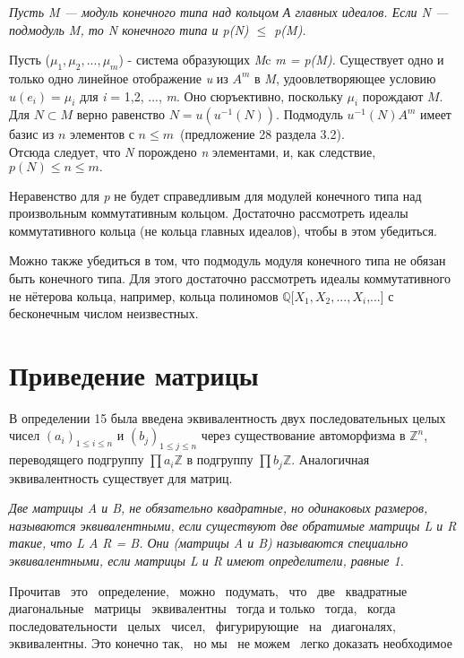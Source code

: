 

\begin{predl}
\hspace*{0.5cm}

\textit{Пусть M — модуль конечного типа над кольцом А главных идеалов. Если N — подмодуль M, то N конечного типа и p(N) $\leqslant $ p(M).}
\end{predl}
\begin{myproof}
Пусть ($\mu_1, \mu_2, ... ,\mu_m$) - система образующих \textit{M}c \textit{m = p(M).}
Существует одно и только одно линейное отображение \textit{u} из $A^m$ в \textit{M}, удоовлетворяющее условию $u(e_i) = \mu_i$ для \textit{i} = 1,2, ..., \textit{m}. Оно сюръективно, поскольку $\mu_i$ порождают $M$.
Для $N \subset M $ верно равенство $N = u(u^{-1}(N))$. Подмодуль $u^{-1}(N)A^{m}$
имеет базис из $n$ элементов с $n \leqslant m$~(предложение 28 раздела 3.2).\\
Отсюда следует, что \textit{N} порождено \textit{n} элементами, и, как следствие, $p(N) \leqslant n \leqslant m.$ 
\end{myproof}
\begin{mynotice}
 Неравенство для \textit{p} не будет справедливым для модулей конечного типа над произвольным коммутативным кольцом. Достаточно рассмотреть идеалы коммутативного кольца (не кольца главных идеалов), чтобы в этом убедиться. 

 Можно также убедиться в том, что подмодуль модуля конечного типа не обязан быть конечного типа. Для этого достаточно рассмотреть идеалы коммутативного не нётерова кольца, например, кольца полиномов $\mathbb{Q}$[$X_1, X_2, ..., X_i$,...] с бесконечным числом неизвестных.
 \end{mynotice}
\sectiontop
\section{Приведение матрицы}
\noindent В определении 15 была введена эквивалентность двух последовательных целых чисел $(a_i)_{1\leqslant i\leqslant n}$ и $(b_j)_{1 \leqslant j \leqslant n}$ через существование автоморфизма в $\mathbb{Z}^n$, переводящего подгруппу $\prod a_i \mathbb{Z}$ в подгруппу $\prod b_j \mathbb{Z}$. Аналогичная эквивалентность существует для матриц.

\begin{determ}
\hspace*{0.5cm}

\textit{ Две матрицы A и B, не обязательно квадратные, но одинаковых размеров, называются эквивалентными, если существуют две обратимые матрицы L и R такие, что L A R = B. Они (матрицы A и B) называются специально эквивалентными, если матрицы L и R имеют определители, равные 1.}
\end{determ}
Прочитав ~это~ определение, ~можно~ подумать, ~что ~две~ квадратные~ диагональные~ матрицы ~эквивалентны ~тогда и только~ тогда,~ когда последовательности~ целых~ чисел,~ фигурирующие~ на~ диагоналях,~ эквивалентны. Это конечно так,~ но мы~ не можем~ легко доказать необходимое

